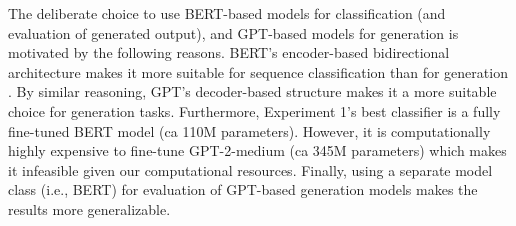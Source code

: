 The deliberate choice to use BERT-based models for classification (and evaluation of generated output), and GPT-based models for generation is motivated by the following reasons. BERT's encoder-based bidirectional architecture makes it more suitable for sequence classification than for generation \citep{devlin-etal-2019-bert}. By similar reasoning, GPT's decoder-based structure makes it a more suitable choice for generation tasks. Furthermore, Experiment 1's best classifier is a fully fine-tuned BERT model (ca 110M parameters). However, it is computationally highly expensive to fine-tune GPT-2-medium (ca 345M parameters) which makes it infeasible given our computational resources. Finally, using a separate model class (i.e., BERT) for evaluation of GPT-based generation models makes the results more generalizable.






            


